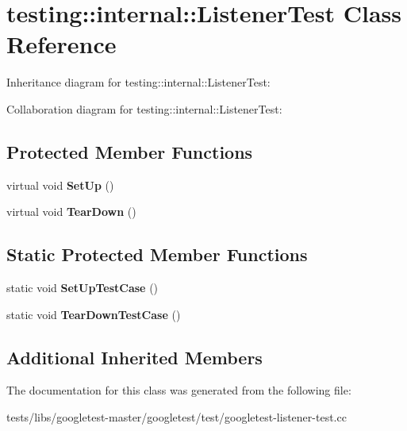\hypertarget{classtesting_1_1internal_1_1ListenerTest}{}\section{testing\+:\+:internal\+:\+:Listener\+Test Class Reference}
\label{classtesting_1_1internal_1_1ListenerTest}


Inheritance diagram for testing\+:\+:internal\+:\+:Listener\+Test\+:


Collaboration diagram for testing\+:\+:internal\+:\+:Listener\+Test\+:
\subsection*{Protected Member Functions}
\begin{DoxyCompactItemize}
\item 
\mbox{\label{classtesting_1_1internal_1_1ListenerTest_ace3dbe36b705ddf320518e6cdd919bc8}} 
virtual void {\bfseries Set\+Up} ()
\item 
\mbox{\label{classtesting_1_1internal_1_1ListenerTest_ad112535025d668e3ea14e71d8741c810}} 
virtual void {\bfseries Tear\+Down} ()
\end{DoxyCompactItemize}
\subsection*{Static Protected Member Functions}
\begin{DoxyCompactItemize}
\item 
\mbox{\label{classtesting_1_1internal_1_1ListenerTest_a7cbc298576e584b4021d0375204b7391}} 
static void {\bfseries Set\+Up\+Test\+Case} ()
\item 
\mbox{\label{classtesting_1_1internal_1_1ListenerTest_aa35b5f1c6235f0fe98aa2c7f35bb8fe1}} 
static void {\bfseries Tear\+Down\+Test\+Case} ()
\end{DoxyCompactItemize}
\subsection*{Additional Inherited Members}


The documentation for this class was generated from the following file\+:\begin{DoxyCompactItemize}
\item 
tests/libs/googletest-\/master/googletest/test/googletest-\/listener-\/test.\+cc\end{DoxyCompactItemize}
